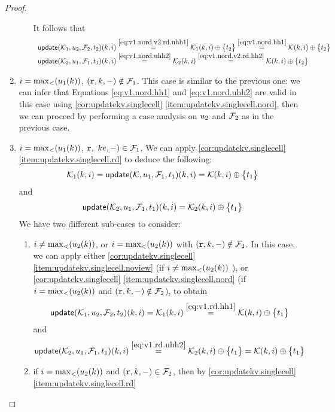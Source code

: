 \begin{proof}
\begin{enumerate}
\begin{enumerate}
It follows that 
\[
\begin{array}{l}
\updateKV(\hh_1, \vi_2, \fp_2, \txid_2)(\ke, i) \stackrel{\cref{eq:v1.nord.v2.rd.uhh1}}{=} \hh_1(\ke, i) \oplus \Set{\txid_2} \stackrel{\cref{eq:v1.nord.hh1}}{=} \mkvs(\ke, i) \oplus \Set{\txid_2}\\
\updateKV(\hh_2,\vi_1,\fp_1, \txid_1)(\ke, i) \stackrel{\cref{eq:v1.nord.uhh2}}{=} \hh_2(\ke, i) \stackrel{\cref{eq:v1.nord.v2.rd.hh2}}{=} \mkvs(\ke, i) \oplus \Set{\txid_2}
\end{array}
\]
\end{enumerate}
\item $i = \max_{<}(u_1(k))$, $(\textnormal{\texttt r}, k, -) \notin \mathcal{F}_1$. This case is similar to the previous one: we can infer 
that Equations \cref{eq:v1.nord.hh1} and \cref{eq:v1.nord.uhh2} are valid in this case using \cref{cor:updatekv.singlecell}
\cref{item:updatekv.singlecell.nord}, then we can proceed by performing a case analysis on $u_2$ and $\mathcal{F}_2$ as in the previous case.
\item $i = \max_{<}(u_1(k))$, $\textnormal{\texttt r},\ ke, -) \in \mathcal{F}_1$. We can apply \cref{cor:updatekv.singlecell}\cref{item:updatekv.singlecell.rd} 
to deduce the following: 
\begin{equation}
\hh_1(\ke, i) = \updateKV(\mkvs, \vi_1, \fp_1, \txid_1)(\ke, i) = \mkvs(\ke, i) \oplus \Set{\txid_1}
\label{eq:v1.rd.hh1}
\end{equation}
and
\begin{equation}
\updateKV(\hh_2, \vi_1, \fp_1, \txid_1)(\ke, i) = \hh_2(\ke, i) \oplus \Set{\txid_1}
\label{eq:v1.rd.uhh2}
\end{equation}
We have two different sub-cases to consider: 
\begin{enumerate}
\item $i \neq \max_{<}(u_2(k))$, or $i = \max_{<}(u_2(k))$ with $(\textnormal{\texttt r},k,-) \notin \mathcal{F}_2$. In this case, we can apply either 
\cref{cor:updatekv.singlecell}\cref{item:updatekv.singlecell.noview} (if $i \neq \max_{<}(u_2(k))$ ), or 
\cref{cor:updatekv.singlecell} \cref{item:updatekv.singlecell.nord} (if $i = \max_{<}(u_2(k))$ and $(\textnormal{\texttt r}, k, -) \notin \mathcal{F}_2$), 
to obtain 
\[
\updateKV(\hh_1, \vi_2, \fp_2, \txid_2)(\ke, i) = \hh_1(\ke, i) \stackrel{\cref{eq:v1.rd.hh1}}{=} \mkvs(\ke, i) \oplus \Set{\txid_1}
\]
and
\[
\updateKV(\hh_2, \vi_1, \fp_1, \txid_1)(\ke, i) \stackrel{\cref{eq:v1.rd.uhh2}}{=} \hh_2(\ke, i) \oplus \Set{ \txid_1 } = 
\mkvs(\ke, i) \oplus \Set{ \txid_1 }
\]
\item if $i = \max_{<}(u_2(k))$ and $(\textnormal{\texttt r}, k, -) \in \mathcal{F}_2$, then by \cref{cor:updatekv.singlecell}\cref{item:updatekv.singlecell.rd} 

\end{enumerate}
\end{enumerate}
\end{proof}
